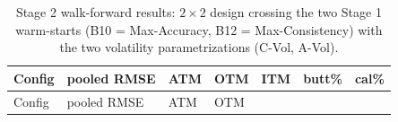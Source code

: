 \documentclass[
  11pt,
]{article}
\begin{document}
\begin{longtable}[]{@{}
  >{\raggedright\arraybackslash}p{}
  >{\raggedright\arraybackslash}p{}
  >{\raggedright\arraybackslash}p{}
  >{\raggedright\arraybackslash}p{}
  >{\raggedright\arraybackslash}p{}
  >{\raggedright\arraybackslash}p{}
  >{\raggedright\arraybackslash}p{}@{}}
\caption{Stage 2 walk-forward results: \(2 \times 2\) design crossing
the two Stage 1 warm-starts (B10 = Max-Accuracy, B12 = Max-Consistency)
with the two volatility parametrizations (C-Vol,
A-Vol).}\label{tbl-stage2}\tabularnewline
\toprule\noalign{}
\begin{minipage}[b]{\linewidth}\raggedright
Config
\end{minipage} & \begin{minipage}[b]{\linewidth}\raggedright
pooled RMSE
\end{minipage} & \begin{minipage}[b]{\linewidth}\raggedright
ATM
\end{minipage} & \begin{minipage}[b]{\linewidth}\raggedright
OTM
\end{minipage} & \begin{minipage}[b]{\linewidth}\raggedright
ITM
\end{minipage} & \begin{minipage}[b]{\linewidth}\raggedright
butt\%
\end{minipage} & \begin{minipage}[b]{\linewidth}\raggedright
cal\%
\end{minipage} \\
\midrule\noalign{}
\endfirsthead
\toprule\noalign{}
\begin{minipage}[b]{\linewidth}\raggedright
Config
\end{minipage} & \begin{minipage}[b]{\linewidth}\raggedright
pooled RMSE
\end{minipage} & \begin{minipage}[b]{\linewidth}\raggedright
ATM
\end{minipage} & \begin{minipage}[b]{\linewidth}\raggedright
OTM
\end{minipage} & \begin{minipage}[b]{\linewidth}\raggedright

\end{minipage}
\end{longtable}
\end{document}
